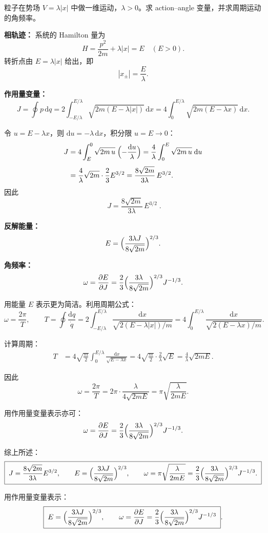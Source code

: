 \begin{question}
粒子在势场 \(V=\lambda|x|\) 中做一维运动，\(\lambda>0\)。求 action--angle 变量，并求周期运动的角频率。

\begin{solution}
\noindent\textbf{相轨迹：} 系统的 Hamilton 量为
\[
H=\frac{p^2}{2m}+\lambda|x|=E\quad(E>0).
\]
转折点由 \(E=\lambda|x|\) 给出，即
\[
|x_{\pm}|=\frac{E}{\lambda}.
\]

\noindent\textbf{作用量变量：}
\[
J=\oint p\,\mathrm dq
=2\int_{-E/\lambda}^{E/\lambda}\sqrt{2m(E-\lambda|x|)}\,\mathrm dx
=4\int_{0}^{E/\lambda}\sqrt{2m(E-\lambda x)}\,\mathrm dx .
\]

令 \(u=E-\lambda x\)，则 \(\mathrm du=-\lambda\,\mathrm dx\)，积分限 \(u=E\to0\)：
\[
\begin{aligned}
J&=4\int_{E}^{0}\sqrt{2m\,u}\;\Bigl(-\frac{\mathrm du}{\lambda}\Bigr)
=\frac{4}{\lambda}\int_{0}^{E}\sqrt{2m\,u}\;\mathrm du \\[4pt]
&=\frac{4}{\lambda}\sqrt{2m}\cdot\frac{2}{3}E^{3/2}
=\frac{8\sqrt{2m}}{3\lambda}\,E^{3/2}.
\end{aligned}
\]
因此
\[
\boxed{\;J=\frac{8\sqrt{2m}}{3\lambda}\,E^{3/2}\;}.
\]

\noindent\textbf{反解能量：}
\[
E=\Bigl(\frac{3\lambda J}{8\sqrt{2m}}\Bigr)^{2/3}.
\]

\noindent\textbf{角频率：}
\[
\omega=\frac{\partial E}{\partial J}
=\frac{2}{3}\Bigl(\frac{3\lambda}{8\sqrt{2m}}\Bigr)^{2/3}J^{-1/3}.
\]

用能量 \(E\) 表示更为简洁。利用周期公式：
\[
\omega=\frac{2\pi}{T},\qquad
T=\oint\frac{\mathrm dq}{\dot q}
=2\int_{-E/\lambda}^{E/\lambda}\frac{\mathrm dx}{\sqrt{2(E-\lambda|x|)/m}}
=4\int_0^{E/\lambda}\frac{\mathrm dx}{\sqrt{2(E-\lambda x)/m}} .
\]

计算周期：
\[
\begin{aligned}
T&=4\sqrt{\frac{m}{2}}\int_0^{E/\lambda}\frac{\mathrm dx}{\sqrt{E-\lambda x}}
=4\sqrt{\frac{m}{2}}\cdot\frac{2}{\lambda}\sqrt{E}
=\frac{4}{\lambda}\sqrt{2mE}.
\end{aligned}
\]

因此
\[
\omega=\frac{2\pi}{T}=2\pi\cdot\frac{\lambda}{4\sqrt{2mE}}
=\pi\sqrt{\frac{\lambda}{2mE}} .
\]

用作用量变量表示亦可：
\[
\omega=\frac{\partial E}{\partial J}
=\frac{2}{3}\Bigl(\frac{3\lambda}{8\sqrt{2m}}\Bigr)^{2/3}J^{-1/3}.
\]

综上所述：
\[
\boxed{\;
J=\frac{8\sqrt{2m}}{3\lambda}E^{3/2},\qquad
E=\Bigl(\frac{3\lambda J}{8\sqrt{2m}}\Bigr)^{2/3},\qquad
\omega=\pi\sqrt{\frac{\lambda}{2mE}}
=\frac{2}{3}\Bigl(\frac{3\lambda}{8\sqrt{2m}}\Bigr)^{2/3}J^{-1/3}.
\;}
\]

用作用量变量表示：
\[
\boxed{\;E=\Bigl(\frac{3\lambda J}{8\sqrt{2m}}\Bigr)^{2/3},\qquad
\omega=\frac{\partial E}{\partial J}
=\frac{2}{3}\Bigl(\frac{3\lambda}{8\sqrt{2m}}\Bigr)^{2/3}J^{-1/3}\;}.
\]
\end{solution}
\end{question}

